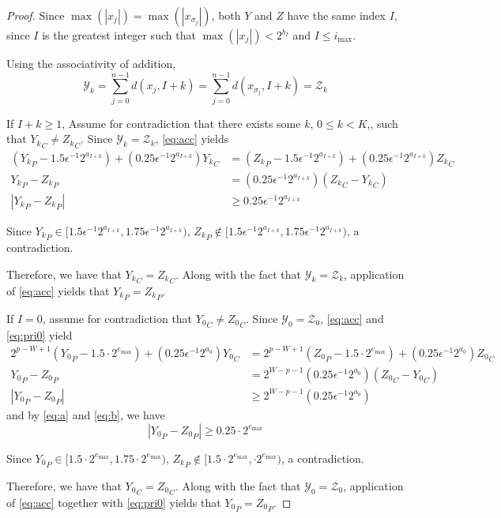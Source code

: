       \begin{proof}
        Since $\max(|x_j|) = \max(|x_{\sigma_j}|)$, both $Y$ and $Z$ have the same index $I$, since $I$ is the greatest integer such that $\max(|x_j|) < 2^{b_I}$ and $I \leq i_{\max}$.

        Using the associativity of addition,
        \begin{equation*}
          \mathcal{Y}_k = \sum\limits_{j = 0}^{n - 1}d(x_j, I + k) = \sum\limits_{j = 0}^{n - 1}d(x_{\sigma_j}, I + k) = \mathcal{Z}_k
        \end{equation*}

        If $I + k \geq 1$, Assume for contradiction that there exists some $k$, $0 \leq k < K$,, such that ${Y_k}_C \neq {Z_k}_C$. Since $\mathcal{Y}_k = \mathcal{Z}_k$, \eqref{eq:acc} yields
        \begin{align*}
          ({Y_k}_P - 1.5 \epsilon^{-1}2^{a_{I + k}}) + (0.25\epsilon^{-1}2^{a_{I + k}}){Y_k}_C &= ({Z_k}_P - 1.5 \epsilon^{-1}2^{a_{I + k}}) + (0.25\epsilon^{-1}2^{a_{I + k}}){Z_k}_C\\
          {Y_k}_P - {Z_k}_P &= (0.25\epsilon^{-1}2^{a_{I + k}})({Z_k}_C - {Y_k}_C)\\
          |{Y_k}_P - {Z_k}_P| &\geq 0.25\epsilon^{-1}2^{a_{I + k}}
        \end{align*}

        Since ${Y_k}_P \in [1.5  \epsilon^{-1} 2^{a_{I + k}}, 1.75  \epsilon^{-1} 2^{a_{I + k}})$, ${Z_k}_P \not\in [1.5  \epsilon^{-1} 2^{a_{I + k}}, 1.75  \epsilon^{-1} 2^{a_{I + k}})$, a contradiction.

        Therefore, we have that ${Y_k}_C = {Z_k}_C$. Along with the fact that $\mathcal{Y}_k = \mathcal{Z}_k$, application of \eqref{eq:acc} yields that ${Y_k}_P = {Z_k}_P$.

        If $I = 0$, assume for contradiction that ${Y_0}_C \neq {Z_0}_C$. Since $\mathcal{Y}_0 = \mathcal{Z}_0$, \eqref{eq:acc} and \eqref{eq:pri0} yield
        \begin{align*}
          2^{p - W + 1}({Y_0}_P - 1.5\cdot2^{e_{\max}}) + (0.25\epsilon^{-1}2^{a_{0}}){Y_0}_C &= 2^{p - W + 1}({Z_0}_P - 1.5\cdot2^{e_{\max}}) + (0.25\epsilon^{-1}2^{a_{0}}){Z_0}_C\\
          {Y_0}_P - {Z_0}_P &= 2^{W - p - 1}(0.25\epsilon^{-1}2^{a_{0}})({Z_0}_C - {Y_0}_C)\\
          |{Y_0}_P - {Z_0}_P| &\geq 2^{W - p - 1}(0.25\epsilon^{-1}2^{a_{0}})
        \end{align*}
        and by \eqref{eq:a} and \eqref{eq:b}, we have
        \begin{equation*}
          |{Y_0}_P - {Z_0}_P| \geq 0.25\cdot2^{e_{\max}}
        \end{equation*}

        Since ${Y_0}_P \in [1.5  \cdot2^{e_{\max}}, 1.75  \cdot2^{e_{\max}})$, ${Z_k}_P \not\in [1.5  \cdot2^{e_{\max}}, \cdot2^{e_{\max}})$, a contradiction.

        Therefore, we have that ${Y_0}_C = {Z_0}_C$. Along with the fact that $\mathcal{Y}_0 = \mathcal{Z}_0$, application of \eqref{eq:acc} together with \eqref{eq:pri0} yields that ${Y_0}_P = {Z_0}_P$.
      \end{proof}

